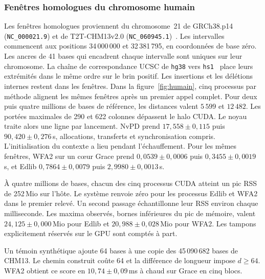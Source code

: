 \subsubsection{Fenêtres homologues du chromosome humain}
Les fenêtres homologues proviennent du chromosome~21 de GRCh38.p14 (\texttt{NC\_000021.9}) et de T2T-CHM13v2.0 (\texttt{NC\_060945.1})~\cite{grch38,t2t,chmreleases}. Les intervalles commencent aux positions 34\,000\,000 et 32\,381\,795, en coordonnées de base zéro. Les ancres de 41 bases qui encadrent chaque intervalle sont uniques sur leur chromosome. La chaîne de correspondance UCSC de \texttt{hg38} vers \texttt{hs1}~\cite{ucscchain} place leurs extrémités dans le même ordre sur le brin positif. Les insertions et les délétions internes restent dans les fenêtres.
Dans la figure~\ref{fig:humain}, cinq processus par méthode alignent les mêmes fenêtres après un premier appel complet. Pour deux puis quatre millions de bases de référence, les distances valent \(5\,599\) et \(12\,482\). Les portées maximales de 290 et 622 colonnes dépassent le halo CUDA. Le noyau traite alors une ligne par lancement. NvPD prend \(17{,}558\pm0{,}115\) puis \(90{,}420\pm0{,}276\)\,s, allocations, transferts et synchronisation compris. L'initialisation du contexte a lieu pendant l'échauffement. Pour les mêmes fenêtres, WFA2 sur un cœur Grace prend \(0{,}0539\pm0{,}0006\) puis \(0{,}3455\pm0{,}0019\)\,s, et Edlib \(0{,}7864\pm0{,}0079\) puis \(2{,}9980\pm0{,}0013\)\,s.

À quatre millions de bases, chacun des cinq processus CUDA atteint un pic RSS de 252\,Mio sur l’hôte. Le système renvoie zéro pour les processus Edlib et WFA2 dans le premier relevé. Un second passage échantillonne leur RSS environ chaque milliseconde. Les maxima observés, bornes inférieures du pic de mémoire, valent \(24{,}125\pm0{,}000\)\,Mio pour Edlib et \(20{,}988\pm0{,}028\)\,Mio pour WFA2. Les tampons explicitement réservés sur le GPU sont comptés à part.

Un témoin synthétique ajoute 64 bases à une copie des 45\,090\,682 bases de CHM13. Le chemin construit coûte 64 et la différence de longueur impose \(d\ge64\). WFA2 obtient ce score en \(10{,}74\pm0{,}09\)\,ms à chaud sur Grace en cinq blocs.








